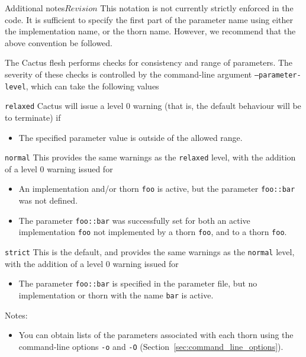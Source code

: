 \begin{cactuspart}{Additional notes}{}{$Revision$}
This notation is not currently strictly enforced in the code. It is
sufficient to specify the first part of the parameter name using either
the implementation name, or the thorn name. However, we recommend
that the above convention be followed.

The Cactus flesh performs checks for consistency and range of parameters.
The severity of these checks is controlled by the command-line argument
\texttt{--parameter-level}, which can take the following values
\begin{Lentry}
\item[\texttt{relaxed}] Cactus will issue a level 0 warning (that is, the
default behaviour will be to terminate) if
\begin{itemize}
\item{} The specified parameter value is outside of the allowed range.
\end{itemize}

\item [\texttt{normal}]
This provides the same warnings as the
\texttt{relaxed} level, with the addition of a level 0 warning issued for
\begin{itemize}
\item{} An implementation and/or thorn \texttt{foo} is active, but the
        parameter \texttt{foo::bar} was not defined.
\item{} The parameter \texttt{foo::bar} was successfully set for both an
        active implementation \texttt{foo} not implemented by a thorn \texttt{foo},
        and to a thorn \texttt{foo}.
\end{itemize}

\item [\texttt{strict}]
This is the default, and provides the same warnings as the \texttt{normal}
level, with the addition of a level 0 warning issued for
\begin{itemize}
\item{} The parameter \texttt{foo::bar} is specified in the parameter file,
        but no implementation or thorn with the name \texttt{bar} is active.
\end{itemize}
\end{Lentry}

Notes:

\begin{itemize}

\item{} You can obtain lists of the parameters associated with
each thorn using the command-line options \texttt{-o} and \texttt{-O}
(Section~\ref{sec:command_line_options}).


\end{itemize}
\end{cactuspart}
